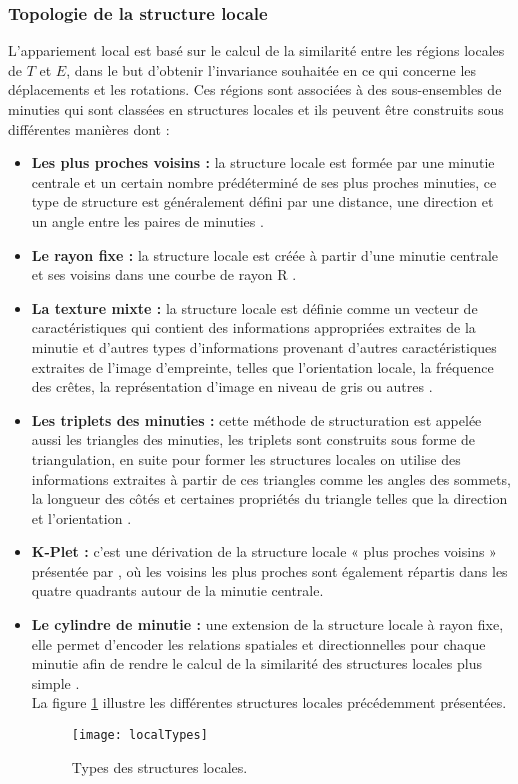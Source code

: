 \subsubsection{Topologie de la structure locale }
\label{structures}
L'appariement local est basé sur le calcul de la similarité entre les régions locales de $ T $ et $ E $, dans le but d'obtenir l'invariance souhaitée en ce qui concerne les déplacements et les rotations. Ces régions sont associées à des sous-ensembles de minuties qui sont classées en structures locales et ils peuvent être construits sous différentes manières dont :
\begin{itemize}
	\item \textbf{Les plus proches voisins :} la structure locale est formée par une minutie centrale et un certain nombre prédéterminé de ses plus proches minuties, ce type de structure est généralement défini par une distance, une direction et un angle entre les paires de minuties \citep{jiang2000fingerprint}.
	\item \textbf{Le rayon fixe :} la structure locale est créée à partir d'une minutie centrale et ses voisins dans une courbe de rayon R \citep{ratha2000robust}.
	\item \textbf{La texture mixte :} la structure locale est définie comme un vecteur de caractéristiques qui contient des informations appropriées extraites de la minutie et d'autres types d'informations provenant d'autres caractéristiques extraites de l'image d'empreinte, telles que l'orientation locale, la fréquence des crêtes, la représentation d'image en niveau de gris ou autres \citep{benhammadi2007fingerprint}.
	\item \textbf{Les triplets des minuties : }cette méthode de structuration est appelée aussi les triangles des minuties, les triplets sont construits sous forme de triangulation, en suite pour former les structures locales on utilise des informations extraites à partir de ces triangles comme les angles des sommets, la longueur des côtés et certaines propriétés du triangle telles que la direction et l'orientation \citep{maltoni2009handbook}.
	\item \textbf{K-Plet :} c'est une dérivation de la structure locale « plus proches voisins » présentée par \citep{chikkerur2006k}, où les voisins les plus proches sont également répartis dans les quatre quadrants autour de la minutie centrale.
	\item \textbf{Le cylindre de minutie :} une extension de la structure locale à rayon fixe, elle permet d'encoder les relations spatiales et directionnelles pour chaque minutie afin de rendre le calcul de la similarité des structures locales plus simple \citep{cappelli2010minutia}.
	\\
	La figure \ref{fig:chapitre2localTypes} illustre les différentes structures locales précédemment présentées.
	
	\begin{figure}[H]
		\centering
		\texttt{[image: localTypes]}
		\caption{Types des structures locales.}
		\label{fig:chapitre2localTypes}
	\end{figure}
\end{itemize}	

